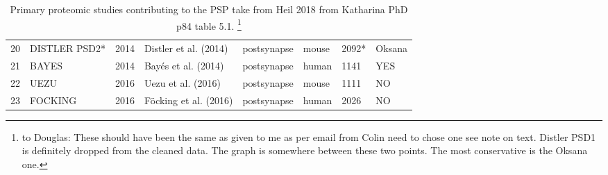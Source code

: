 \begin{table}[]
\begin{tabular}{llllllll}
20&DISTLER PSD2*&2014&Distler et al. (2014)&postsynapse& mouse& 2092*& Oksana\\
21&BAYES&2014&Bayés et al. (2014)&postsynapse& human &1141& YES\\
22&UEZU&2016&Uezu et al. (2016)&postsynapse &mouse &1111 &NO\\
23&FOCKING&2016&Föcking et al. (2016)&postsynapse& human &2026 &NO\\
\bottomrule
    \end{tabular}
    \caption[Primary Proteomic studies appearing in PSP cleaned from Heil (2018)]{Primary proteomic studies contributing to the PSP take from Heil 2018\cite{heil2018systems} from Katharina PhD p84 table 5.1. \footnote{to Douglas: These should have been the same as given to me as per email from Colin need to chose one see note on text. Distler PSD1 is definitely dropped from the cleaned data. The graph is somewhere between these two points. The most conservative is the Oksana one.}}
    \label{tab:Katharina_phd_studiesFF}
\end{table}

